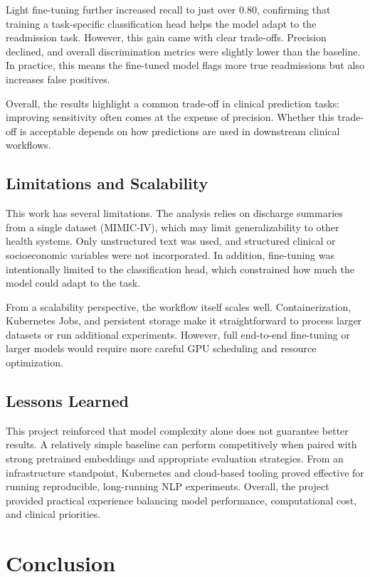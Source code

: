 \documentclass[11pt]{article}
\begin{document}
Light fine-tuning further increased recall to just over 0.80, confirming that training a task-specific classification head helps the model adapt to the readmission task. However, this gain came with clear trade-offs. Precision declined, and overall discrimination metrics were slightly lower than the baseline. In practice, this means the fine-tuned model flags more true readmissions but also increases false positives.

Overall, the results highlight a common trade-off in clinical prediction tasks: improving sensitivity often comes at the expense of precision. Whether this trade-off is acceptable depends on how predictions are used in downstream clinical workflows.

\subsection{Limitations and Scalability}

This work has several limitations. The analysis relies on discharge summaries from a single dataset (MIMIC-IV), which may limit generalizability to other health systems. Only unstructured text was used, and structured clinical or socioeconomic variables were not incorporated. In addition, fine-tuning was intentionally limited to the classification head, which constrained how much the model could adapt to the task.

From a scalability perspective, the workflow itself scales well. Containerization, Kubernetes Jobs, and persistent storage make it straightforward to process larger datasets or run additional experiments. However, full end-to-end fine-tuning or larger models would require more careful GPU scheduling and resource optimization.

\subsection{Lessons Learned}

This project reinforced that model complexity alone does not guarantee better results. A relatively simple baseline can perform competitively when paired with strong pretrained embeddings and appropriate evaluation strategies. From an infrastructure standpoint, Kubernetes and cloud-based tooling proved effective for running reproducible, long-running NLP experiments. Overall, the project provided practical experience balancing model performance, computational cost, and clinical priorities.

\section{Conclusion}
\end{document}

